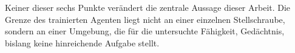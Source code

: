 \documentclass[11pt,a4paper]{article}
\begin{document}
Keiner dieser sechs Punkte verändert die zentrale Aussage dieser Arbeit. Die
Grenze des trainierten Agenten liegt nicht an einer einzelnen
Stellschraube, sondern an einer Umgebung, die für die untersuchte Fähigkeit,
Gedächtnis, bislang keine hinreichende Aufgabe stellt.

\clearpage
{}


\end{document}
